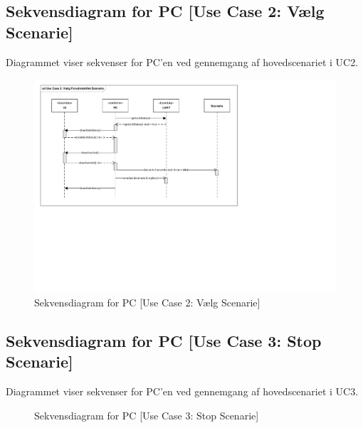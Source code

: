 \subsection{Sekvensdiagram for PC [Use Case 2: Vælg Scenarie]}
Diagrammet viser sekvenser for PC'en ved gennemgang af hovedscenariet i UC2.
\begin{figure}[h]
	\centering %
	\includegraphics[width=\textwidth ,trim=17 235 274 18, clip=true]{Systemarkitektur/Diagrammer/PC_UC2_Sekvens.pdf}%
	\caption{Sekvensdiagram for PC [Use Case 2: Vælg Scenarie]}
	\label{fig:PC_UC2Sek}
\end{figure}

\clearpage

\subsection{Sekvensdiagram for PC [Use Case 3: Stop Scenarie]}
Diagrammet viser sekvenser for PC'en ved gennemgang af hovedscenariet i UC3. 
\begin{figure}[h]
	\centering {}
	\caption{Sekvensdiagram for PC [Use Case 3: Stop Scenarie]}
	\label{fig:PC_UC3Sek}
\end{figure}

